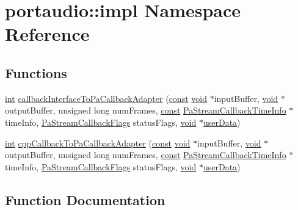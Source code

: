 \hypertarget{namespaceportaudio_1_1impl}{}\section{portaudio\+:\+:impl Namespace Reference}
\label{namespaceportaudio_1_1impl}
\subsection*{Functions}
\begin{DoxyCompactItemize}
\item 
\hyperlink{xmltok_8h_a5a0d4a5641ce434f1d23533f2b2e6653}{int} \hyperlink{namespaceportaudio_1_1impl_aed5b1714d87972dec1744b028e746038}{callback\+Interface\+To\+Pa\+Callback\+Adapter} (\hyperlink{getopt1_8c_a2c212835823e3c54a8ab6d95c652660e}{const} \hyperlink{sound_8c_ae35f5844602719cf66324f4de2a658b3}{void} $\ast$input\+Buffer, \hyperlink{sound_8c_ae35f5844602719cf66324f4de2a658b3}{void} $\ast$output\+Buffer, unsigned long num\+Frames, \hyperlink{getopt1_8c_a2c212835823e3c54a8ab6d95c652660e}{const} \hyperlink{struct_pa_stream_callback_time_info}{Pa\+Stream\+Callback\+Time\+Info} $\ast$time\+Info, \hyperlink{portaudio_8h_a55a005924bcfa0424594f4f65cd4ae82}{Pa\+Stream\+Callback\+Flags} status\+Flags, \hyperlink{sound_8c_ae35f5844602719cf66324f4de2a658b3}{void} $\ast$\hyperlink{xmlparse_8c_a4b666535c828e23ccd16510a0a1a1943}{user\+Data})
\item 
\hyperlink{xmltok_8h_a5a0d4a5641ce434f1d23533f2b2e6653}{int} \hyperlink{namespaceportaudio_1_1impl_a86f66659f56c9468b9a7fd1bf57115c1}{cpp\+Callback\+To\+Pa\+Callback\+Adapter} (\hyperlink{getopt1_8c_a2c212835823e3c54a8ab6d95c652660e}{const} \hyperlink{sound_8c_ae35f5844602719cf66324f4de2a658b3}{void} $\ast$input\+Buffer, \hyperlink{sound_8c_ae35f5844602719cf66324f4de2a658b3}{void} $\ast$output\+Buffer, unsigned long num\+Frames, \hyperlink{getopt1_8c_a2c212835823e3c54a8ab6d95c652660e}{const} \hyperlink{struct_pa_stream_callback_time_info}{Pa\+Stream\+Callback\+Time\+Info} $\ast$time\+Info, \hyperlink{portaudio_8h_a55a005924bcfa0424594f4f65cd4ae82}{Pa\+Stream\+Callback\+Flags} status\+Flags, \hyperlink{sound_8c_ae35f5844602719cf66324f4de2a658b3}{void} $\ast$\hyperlink{xmlparse_8c_a4b666535c828e23ccd16510a0a1a1943}{user\+Data})
\end{DoxyCompactItemize}


\subsection{Function Documentation}
